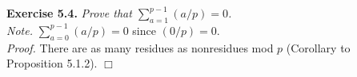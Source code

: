 \documentclass{article}
\begin{document}
\textbf{Exercise 5.4.}
\emph{Prove that $\sum_{a=1}^{p-1} (a/p) = 0$.} \\

\emph{Note.}
$\sum_{a=0}^{p-1} (a/p) = 0$ since $(0/p) = 0$. \\

\emph{Proof.}
There are as many residues as nonresidues mod $p$ (Corollary to Proposition 5.1.2).
$\Box$ \\\\



\end{document}
